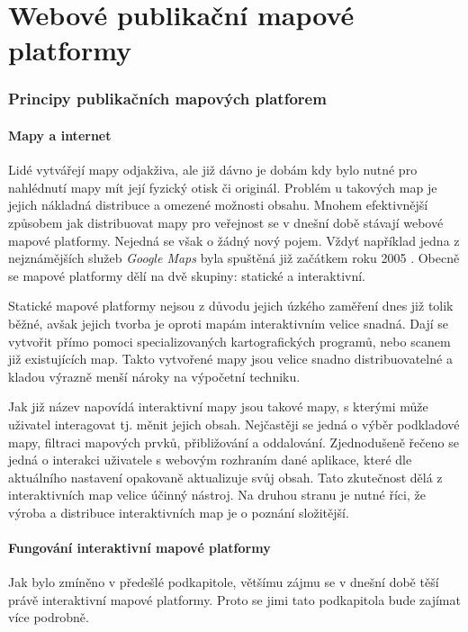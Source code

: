 \newpage
\part{Webové publikační mapové platformy}
\newpage
\section{Principy publikačních mapových platforem}

\subsection{Mapy a internet}
Lidé vytvářejí mapy odjakživa, ale již dávno je dobám kdy bylo nutné pro nahlédnutí mapy mít její fyzický otisk či originál. Problém u takových map je jejich nákladná distribuce a omezené možnosti obsahu. Mnohem efektivnější způsobem jak distribuovat mapy pro veřejnost se v dnešní době stávají webové mapové platformy. Nejedná se však o žádný nový pojem. Vždyť například jedna z nejznámějších služeb \textit{Google Maps} byla spuštěná již začátkem roku 2005 \cite{google_history}.
Obecně se mapové platformy dělí na dvě skupiny: statické a interaktivní.

Statické mapové platformy nejsou z důvodu jejich úzkého zaměření dnes již tolik běžné, avšak jejich tvorba je oproti mapám interaktivním velice snadná. Dají se vytvořit přímo pomoci specializovaných kartografických programů, nebo scanem již existujících map. Takto vytvořené mapy jsou velice snadno distribuovatelné a kladou výrazně menší nároky na výpočetní techniku.

Jak již název napovídá interaktivní mapy jsou takové mapy, s kterými může uživatel interagovat tj. měnit jejich obsah. Nejčastěji se jedná o výběr podkladové mapy, filtraci mapových prvků, přibližování a oddalování. Zjednodušeně řečeno se jedná o interakci uživatele s webovým rozhraním dané aplikace, které dle aktuálního nastavení opakovaně aktualizuje svůj obsah\cite{web_mapping}. Tato zkutečnost dělá z interaktivních map velice účinný nástroj. Na druhou stranu je nutné říci, že výroba a distribuce interaktivních map je o poznání složitější. 

\newpage
\subsection{Fungování interaktivní mapové platformy}
Jak bylo zmíněno v předešlé podkapitole, většímu zájmu se v dnešní době těší právě interaktivní mapové platformy. Proto se jimi tato podkapitola bude zajímat více podrobně. 

